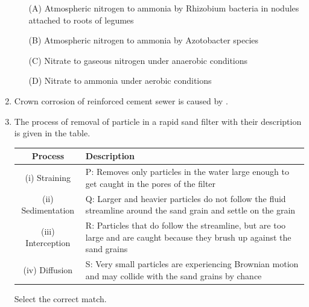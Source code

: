 \documentclass[journal]{IEEEtran}
\numberwithin{equation}{enumi}
\numberwithin{figure}{enumi}
\begin{document}
\begin{enumerate}[start=1, label={Q\arabic*.}]
\begin{itemize}
  \item[(A)] Atmospheric nitrogen to ammonia by Rhizobium bacteria in nodules attached to roots of legumes
  \item[(B)] Atmospheric nitrogen to ammonia by Azotobacter species
  \item[(C)] Nitrate to gaseous nitrogen under anaerobic conditions
  \item[(D)] Nitrate to ammonia under aerobic conditions
  \end{itemize}
\item Crown corrosion of reinforced cement sewer is caused by \underline{\hspace{1.5cm}}.
  \begin{enumerate}[label=(\Alph*)]
  \end{enumerate}
\newpage
\item The process of removal of particle in a rapid sand filter with their description is given in the table.
\begin{table}[H]
\centering
\begin{tabular}{|c|p{9cm}|}
\hline
\textbf{Process} & \textbf{Description} \\
\hline
(i) Straining & P: Removes only particles in the water large enough to get caught in the pores of the filter \\
\hline
(ii) Sedimentation & Q: Larger and heavier particles do not follow the fluid streamline around the sand grain and settle on the grain \\
\hline
(iii) Interception & R: Particles that do follow the streamline, but are too large and are caught because they brush up against the sand grains \\
\hline
(iv) Diffusion & S: Very small particles are experiencing Brownian motion and may collide with the sand grains by chance \\
\hline
\end{tabular}
\end{table}
Select the correct match.
\begin{enumerate}[label=(\Alph*)]
  \begin{multicols}{2}

\end{multicols}
\end{enumerate}
\end{enumerate}
\end{document}
